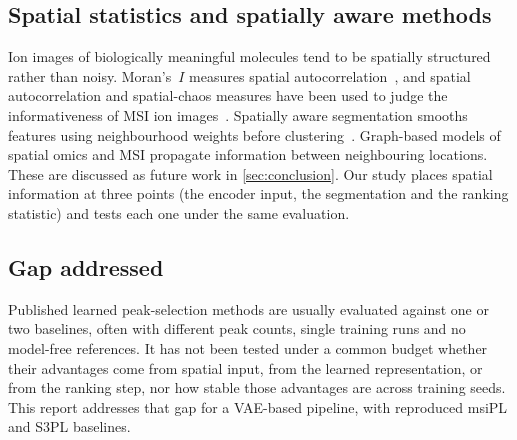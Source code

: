 \subsection{Spatial statistics and spatially aware methods}
Ion images of biologically meaningful molecules tend to be spatially
structured rather than noisy. Moran's~$I$ measures spatial
autocorrelation~\citep{moran1950notes}, and spatial autocorrelation and
spatial-chaos measures have been used to judge the informativeness of MSI ion
images~\citep{alexandrov2013testing,cassese2016spatial}. Spatially aware
segmentation smooths features using neighbourhood weights before
clustering~\citep{alexandrov2011efficient}. Graph-based models of spatial
omics and MSI propagate information between neighbouring locations. These are
discussed as future work in \cref{sec:conclusion}. Our study places spatial
information at three points (the encoder input, the segmentation and the
ranking statistic) and tests each one under the same evaluation.

\subsection{Gap addressed}
Published learned peak-selection methods are usually evaluated against one or
two baselines, often with different peak counts, single training runs and no
model-free references. It has not been tested under a common budget whether
their advantages come from spatial input, from the learned representation, or
from the ranking step, nor how stable those advantages are across training
seeds. This report addresses that gap for a VAE-based pipeline, with
reproduced msiPL and S3PL baselines.
